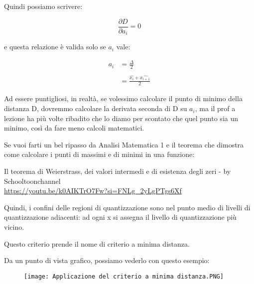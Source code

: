 Quindi possiamo scrivere: 

{
    \Large 
    \begin{equation}
        \frac{\partial D}{\partial a_i} = 0
    \end{equation}
}

e questa relazione è valida solo se $a_i$ vale: 

{
    \Large
    \begin{equation}
        \begin{split}
            a_i 
            &= 
            \frac{\Delta}{2}
            \\
            &\quad
            \\
            &=
            \frac{\hat{x_i} + \hat{x_{i+1}}}{2}
        \end{split}
    \end{equation}
}

\begin{tcolorbox}
    Ad essere puntigliosi, in realtà, se volessimo calcolare il punto di minimo della distanza D, 
    dovremmo calcolare la derivata seconda di D su $a_i$, ma il prof a lezione ha più volte ribadito 
    che lo diamo per scontato che quel punto sia un minimo, così da fare meno calcoli matematici. \newline 

    Se vuoi farti un bel ripasso da Analisi Matematica 1 e il teorema che dimostra come calcolare i punti di massimi e di minimi in una funzione: \newline 

    Il teorema di Weierstrass, dei valori intermedi e di esistenza degli zeri - by Schooltoonchannel \\ 
    \url{https://youtu.be/k0AIKTrO7Fw?si=FNLg_2yLgPTgs6Xf}
\end{tcolorbox}


Quindi, i confini delle regioni di quantizzazione sono nel punto medio di livelli di quantizzazione adiacenti: 
ad ogni x si assegna il livello di quantizzazione più vicino. \newline 

Questo criterio prende il nome di criterio a minima distanza. \newline 

Da un punto di vista grafico, possiamo vederlo con questo esempio: 

\begin{figure}[h]
    \centering
    \texttt{[image: Applicazione del criterio a minima distanza.PNG]}
\end{figure}

